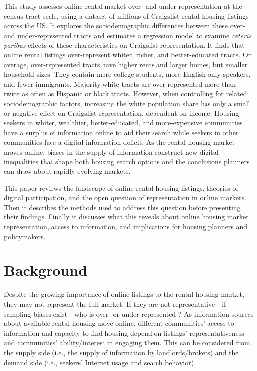 \documentclass[11pt,onecolumn]{article} %
\begin{document}
This study assesses online rental market over- and under-representation at the census tract scale, using a dataset of millions of Craigslist rental housing listings across the US. It explores the sociodemographic differences between these over- and under-represented tracts and estimates a regression model to examine \textit{ceteris paribus} effects of these characteristics on Craigslist representation. It finds that online rental listings over-represent whiter, richer, and better-educated tracts. On average, over-represented tracts have higher rents and larger homes, but smaller household sizes. They contain more college students, more English-only speakers, and fewer immigrants. Majority-white tracts are over-represented more than twice as often as Hispanic or black tracts. However, when controlling for related sociodemographic factors, increasing the white population share has only a small or negative effect on Craigslist representation, dependent on income. Housing seekers in whiter, wealthier, better-educated, and more-expensive communities have a surplus of information online to aid their search while seekers in other communities face a digital information deficit. As the rental housing market moves online, biases in the supply of information construct new digital inequalities that shape both housing search options and the conclusions planners can draw about rapidly-evolving markets.

This paper reviews the landscape of online rental housing listings, theories of digital participation, and the open question of representation in online markets. Then it describes the methods used to address this question before presenting their findings. Finally it discusses what this reveals about online housing market representation, access to information, and implications for housing planners and policymakers.




\section{Background}

Despite the growing importance of online listings to the rental housing market, they may not represent the full market. If they are not representative---if sampling biases exist---who is over- or under-represented \citep[cf.][]{worthen_invitation_2014}? As information sources about available rental housing move online, different communities' access to information and capacity to find housing depend on listings' representativeness and communities' ability/interest in engaging them. This can be considered from the supply side (i.e., the supply of information by landlords/brokers) and the demand side (i.e., seekers' Internet usage and search behavior).
\end{document}
